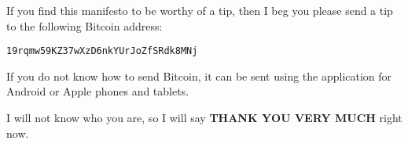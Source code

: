 If you find this manifesto to be worthy of a tip, then I beg you please send a tip to the following Bitcoin address:

\bigskip

\texttt{19rqmw59KZ37wXzD6nkYUrJoZfSRdk8MNj}
\quad
{}

\bigskip

If you do not know how to send Bitcoin, it can be sent using the  application for Android or Apple phones and tablets.

I will not know who you are, so I will say \textbf{THANK YOU VERY MUCH} right now.
